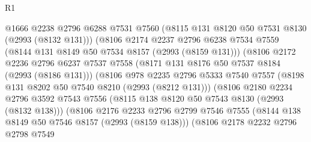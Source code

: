 \begin{lexlean}{R1}
\begin{coremodule}
                                @1666
                                @2238
                                @2796
                                @6288
                                @7531
                                @7560
                                (@8115 @131 @8120 @50 @7531 @8130 (@2993 (@8132 @131)))
                                (@8106
                                  @2174
                                  @2237
                                  @2796
                                  @6238
                                  @7534
                                  @7559
                                  (@8144 @131 @8149 @50 @7534 @8157 (@2993 (@8159 @131)))
                                  (@8106
                                    @2172
                                    @2236
                                    @2796
                                    @6237
                                    @7537
                                    @7558
                                    (@8171 @131 @8176 @50 @7537 @8184 (@2993 (@8186 @131)))
                                    (@8106
                                      @978
                                      @2235
                                      @2796
                                      @5333
                                      @7540
                                      @7557
                                      (@8198 @131 @8202 @50 @7540 @8210 (@2993 (@8212 @131)))
                                      (@8106
                                        @2180
                                        @2234
                                        @2796
                                        @3592
                                        @7543
                                        @7556
                                        (@8115 @138 @8120 @50 @7543 @8130 (@2993 (@8132 @138)))
                                        (@8106
                                          @2176
                                          @2233
                                          @2796
                                          @2799
                                          @7546
                                          @7555
                                          (@8144 @138 @8149 @50 @7546 @8157 (@2993 (@8159 @138)))
                                          (@8106
                                            @2178
                                            @2232
                                            @2796
                                            @2798
                                            @7549

\end{coremodule}
\end{lexlean}
